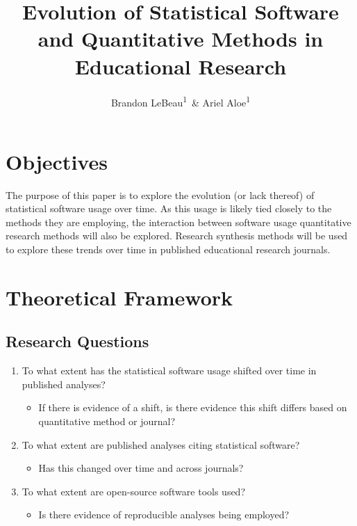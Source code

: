 \documentclass[english,floatsintext,man]{apa6}
\title{Evolution of Statistical Software and Quantitative Methods in
Educational Research}
\author{Brandon LeBeau\textsuperscript{1}~\& Ariel Aloe\textsuperscript{1}}
\affiliation{
    \vspace{0.5cm}
          \textsuperscript{1} University of Iowa  }
\providecommand{\tightlist}{%
  \setlength{\itemsep}{0pt}\setlength{\parskip}{0pt}}
\theoremstyle{definition}
\theoremstyle{definition}
\theoremstyle{remark}
\begin{document}
\maketitle

\setcounter{secnumdepth}{0}



\section{Objectives}\label{objectives}

The purpose of this paper is to explore the evolution (or lack thereof)
of statistical software usage over time. As this usage is likely tied
closely to the methods they are employing, the interaction between
software usage quantitative research methods will also be explored.
Research synthesis methods will be used to explore these trends over
time in published educational research journals.

\section{Theoretical Framework}\label{theoretical-framework}

\subsection{Research Questions}\label{research-questions}

\begin{enumerate}
\def\labelenumi{\arabic{enumi}.}
\tightlist
\item
  To what extent has the statistical software usage shifted over time in
  published analyses?

  \begin{itemize}
  \tightlist
  \item
    If there is evidence of a shift, is there evidence this shift
    differs based on quantitative method or journal?
  \end{itemize}
\item
  To what extent are published analyses citing statistical software?

  \begin{itemize}
  \tightlist
  \item
    Has this changed over time and across journals?
  \end{itemize}
\item
  To what extent are open-source software tools used?

  \begin{itemize}
  \tightlist
  \item
    Is there evidence of reproducible analyses being employed?
  \end{itemize}
\end{enumerate}
\end{document}
